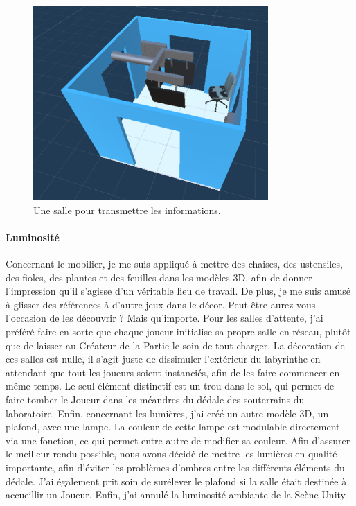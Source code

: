 \documentclass{article}
\begin{document}
\begin{figure}[H]
    \centering
    \includegraphics[width=0.8\textwidth]{Carrefour.png}
    \caption{Une salle pour transmettre les informations.}
    \label{Une salle pour transmettre les informations.}
\end{figure}

\paragraph{Luminosité}
Concernant le mobilier, je me suis appliqué à mettre des chaises, des ustensiles, des fioles, des plantes et des feuilles dans les modèles 3D, afin de donner l'impression qu'il s'agisse d'un véritable lieu de travail. De plus, je me suis amusé à glisser des références à d'autre jeux dans le décor. Peut-être aurez-vous l'occasion de les découvrir ? Mais qu'importe. Pour les salles d'attente, j'ai préféré faire en sorte que chaque joueur initialise sa propre salle en réseau, plutôt que de laisser au Créateur de la Partie le soin de tout charger. La décoration de ces salles est nulle, il s'agit juste de dissimuler l'extérieur du labyrinthe en attendant que tout les joueurs soient instanciés, afin de les faire commencer en même temps. Le seul élément distinctif est un trou dans le sol, qui permet de faire tomber le Joueur dans les méandres du dédale des souterrains du laboratoire. Enfin, concernant les lumières, j'ai créé un autre modèle 3D, un plafond, avec une lampe. La couleur de cette lampe est modulable directement via une fonction, ce qui permet entre autre de modifier sa couleur. Afin d'assurer le meilleur rendu possible, nous avons décidé de mettre les lumières en qualité importante, afin d'éviter les problèmes d'ombres entre les différents éléments du dédale. J'ai également prit soin de surélever le plafond si la salle était destinée à accueillir un Joueur. Enfin, j'ai annulé la luminosité ambiante de la Scène Unity. 
\end{document}
